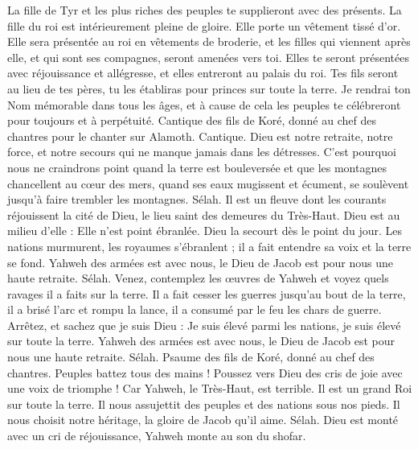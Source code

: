 \begin{multicols}{2}
La fille de Tyr et les plus riches des peuples te supplieront avec des présents.
La fille du roi est intérieurement pleine de gloire. Elle porte un vêtement tissé d'or.
Elle sera présentée au roi en vêtements de broderie, et les filles qui viennent après elle, et qui sont ses compagnes, seront amenées vers toi.
Elles te seront présentées avec réjouissance et allégresse, et elles entreront au palais du roi.
Tes fils seront au lieu de tes pères, tu les établiras pour princes sur toute la terre.
Je rendrai ton Nom mémorable dans tous les âges, et à cause de cela les peuples te célébreront pour toujours et à perpétuité.
\VerseOne{}Cantique des fils de Koré, donné au chef des chantres pour le chanter sur Alamoth. Cantique.
Dieu est notre retraite, notre force, et notre secours qui ne manque jamais dans les détresses.
C'est pourquoi nous ne craindrons point quand la terre est bouleversée et que les montagnes chancellent au cœur des mers,
quand ses eaux mugissent et écument, se soulèvent jusqu'à faire trembler les montagnes. Sélah.
Il est un fleuve dont les courants réjouissent la cité de Dieu, le lieu saint des demeures du Très-Haut.
Dieu est au milieu d'elle : Elle n'est point ébranlée. Dieu la secourt dès le point du jour.
Les nations murmurent, les royaumes s'ébranlent ; il a fait entendre sa voix et la terre se fond.
Yahweh des armées est avec nous, le Dieu de Jacob est pour nous une haute retraite. Sélah.
Venez, contemplez les œuvres de Yahweh et voyez quels ravages il a faits sur la terre.
Il a fait cesser les guerres jusqu'au bout de la terre, il a brisé l'arc et rompu la lance, il a consumé par le feu les chars de guerre.
Arrêtez, et sachez que je suis Dieu : Je suis élevé parmi les nations, je suis élevé sur toute la terre.
Yahweh des armées est avec nous, le Dieu de Jacob est pour nous une haute retraite. Sélah.
\VerseOne{}Psaume des fils de Koré, donné au chef des chantres.
Peuples battez tous des mains ! Poussez vers Dieu des cris de joie avec une voix de triomphe !
Car Yahweh, le Très-Haut, est terrible. Il est un grand Roi sur toute la terre.
Il nous assujettit des peuples et des nations sous nos pieds.
Il nous choisit notre héritage, la gloire de Jacob qu'il aime. Sélah.
Dieu est monté avec un cri de réjouissance, Yahweh monte au son du shofar.

\end{multicols}
